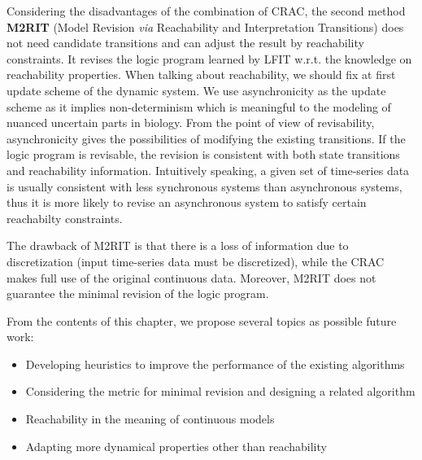 Considering the disadvantages of the combination of CRAC, the second method \textbf{M2RIT} (Model Revision \textit{via} Reachability and Interpretation Transitions) does not need candidate transitions and can adjust the result by reachability constraints.
It revises the logic program learned by LFIT w.r.t. the knowledge on reachability properties.
When talking about reachability, we should fix at first update scheme of the dynamic system.
We use asynchronicity as the update scheme as it implies non-determinism which is meaningful to the modeling of nuanced uncertain parts in biology.
From the point of view of revisability, asynchronicity gives the possibilities of modifying the existing transitions.
If the logic program is revisable, the revision is consistent with both state transitions and reachability information.
Intuitively speaking, a given set of time-series data is usually consistent with less synchronous systems than asynchronous systems, thus it is more likely to revise an asynchronous system to satisfy certain reachabilty constraints.

The drawback of M2RIT is that there is a loss of information due to discretization (input time-series data must be discretized), while the CRAC makes full use of the original continuous data.
Moreover, M2RIT does not guarantee the minimal revision of the logic program.

From the contents of this chapter, we propose several topics as possible future work:
\begin{itemize}
    \item Developing heuristics to improve the performance of the existing algorithms
    \item Considering the metric for minimal revision and designing a related algorithm
    \item Reachability in the meaning of continuous models
    \item Adapting more dynamical properties other than reachability
\end{itemize}